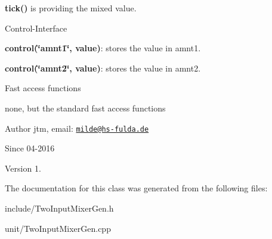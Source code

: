 \begin{DoxyItemize}
\item {\bfseries tick()} is providing the mixed value.
\end{DoxyItemize}

Control-\/\-Interface


\begin{DoxyItemize}
\item {\bfseries control(\char`\"{}amnt1\char`\"{}, value)}\-: stores the value in amnt1.
\item {\bfseries control(\char`\"{}amnt2\char`\"{}, value)}\-: stores the value in amnt2.
\end{DoxyItemize}

Fast access functions
\begin{DoxyItemize}
\item none, but the standard fast access functions
\end{DoxyItemize}

\begin{DoxyAuthor}{Author}
jtm, email\-:  \href{mailto:milde@hs-fulda.de}{\tt milde@hs-\/fulda.\-de} 
\end{DoxyAuthor}
\begin{DoxySince}{Since}
04-\/2016 
\end{DoxySince}
\begin{DoxyVersion}{Version}
1. 
\end{DoxyVersion}


The documentation for this class was generated from the following files\-:\begin{DoxyCompactItemize}
\item 
include/Two\-Input\-Mixer\-Gen.\-h\item 
unit/Two\-Input\-Mixer\-Gen.\-cpp\end{DoxyCompactItemize}
